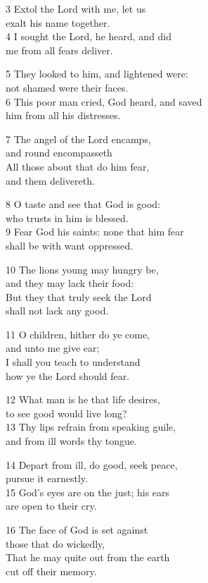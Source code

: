 \begin{multicols}{3}
3 Extol the Lord with me, let us\\
exalt his name together.\\
4 I sought the Lord, he heard, and did\\
me from all fears deliver.

5 They looked to him, and lightened were:\\
not shamed were their faces.\\
6 This poor man cried, God heard, and saved\\
him from all his distresses.

7 The angel of the Lord encamps,\\
and round encompasseth\\
All those about that do him fear,\\
and them delivereth.

8 O taste and see that God is good:\\
who trusts in him is blessed.\\
9 Fear God his saints: none that him fear\\
shall be with want oppressed.

10 The lions young may hungry be,\\
and they may lack their food:\\
But they that truly seek the Lord\\
shall not lack any good.

11 O children, hither do ye come,\\
and unto me give ear;\\
I shall you teach to understand\\
how ye the Lord should fear.

12 What man is he that life desires,\\
to see good would live long?\\
13 Thy lips refrain from speaking guile,\\
and from ill words thy tongue.

14 Depart from ill, do good, seek peace,\\
pursue it earnestly.\\
15 God’s eyes are on the just; his ears\\
are open to their cry.

16 The face of God is set against\\
those that do wickedly,\\
That he may quite out from the earth\\
cut off their memory.


\end{multicols}

